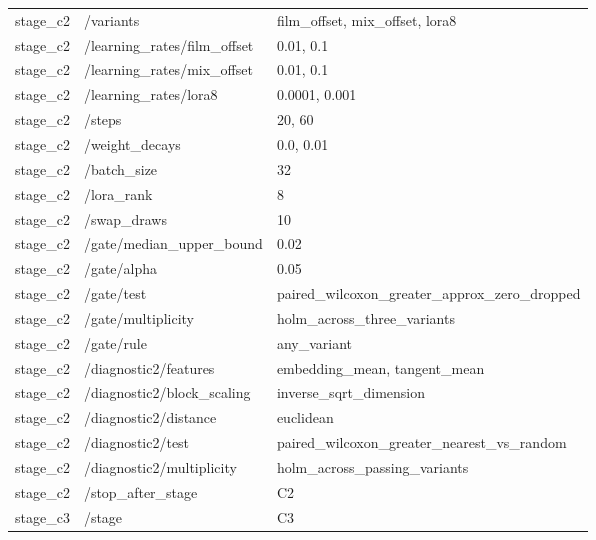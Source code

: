 \begin{longtable}{p{.65in}p{2.8in}p{3.2in}}
stage\_\allowbreak{}c2 & /variants & film\_\allowbreak{}offset, mix\_\allowbreak{}offset, lora8 \\
stage\_\allowbreak{}c2 & /learning\_\allowbreak{}rates/film\_\allowbreak{}offset & 0.01, 0.1 \\
stage\_\allowbreak{}c2 & /learning\_\allowbreak{}rates/mix\_\allowbreak{}offset & 0.01, 0.1 \\
stage\_\allowbreak{}c2 & /learning\_\allowbreak{}rates/lora8 & 0.0001, 0.001 \\
stage\_\allowbreak{}c2 & /steps & 20, 60 \\
stage\_\allowbreak{}c2 & /weight\_\allowbreak{}decays & 0.0, 0.01 \\
stage\_\allowbreak{}c2 & /batch\_\allowbreak{}size & 32 \\
stage\_\allowbreak{}c2 & /lora\_\allowbreak{}rank & 8 \\
stage\_\allowbreak{}c2 & /swap\_\allowbreak{}draws & 10 \\
stage\_\allowbreak{}c2 & /gate/median\_\allowbreak{}upper\_\allowbreak{}bound & 0.02 \\
stage\_\allowbreak{}c2 & /gate/alpha & 0.05 \\
stage\_\allowbreak{}c2 & /gate/test & paired\_\allowbreak{}wilcoxon\_\allowbreak{}greater\_\allowbreak{}approx\_\allowbreak{}zero\_\allowbreak{}dropped \\
stage\_\allowbreak{}c2 & /gate/multiplicity & holm\_\allowbreak{}across\_\allowbreak{}three\_\allowbreak{}variants \\
stage\_\allowbreak{}c2 & /gate/rule & any\_\allowbreak{}variant \\
stage\_\allowbreak{}c2 & /diagnostic2/features & embedding\_\allowbreak{}mean, tangent\_\allowbreak{}mean \\
stage\_\allowbreak{}c2 & /diagnostic2/block\_\allowbreak{}scaling & inverse\_\allowbreak{}sqrt\_\allowbreak{}dimension \\
stage\_\allowbreak{}c2 & /diagnostic2/distance & euclidean \\
stage\_\allowbreak{}c2 & /diagnostic2/test & paired\_\allowbreak{}wilcoxon\_\allowbreak{}greater\_\allowbreak{}nearest\_\allowbreak{}vs\_\allowbreak{}random \\
stage\_\allowbreak{}c2 & /diagnostic2/multiplicity & holm\_\allowbreak{}across\_\allowbreak{}passing\_\allowbreak{}variants \\
stage\_\allowbreak{}c2 & /stop\_\allowbreak{}after\_\allowbreak{}stage & C2 \\
stage\_\allowbreak{}c3 & /stage & C3 \\

\end{longtable}
